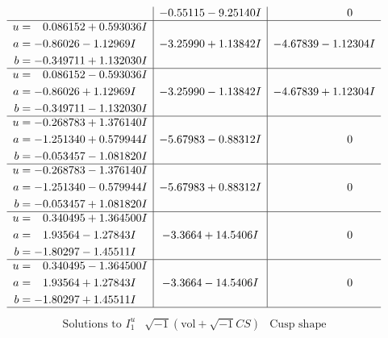 \documentclass[1p]{elsarticle_modified}
\theoremstyle{definition}
\newcommand{\I}{\sqrt{-1}}
\begin{document}
$$\begin{array}{c|c|c}
 & -0.55115 - 9.25140 I & \phantom{-0.000000 } 0 \\ \hline\begin{aligned}
u &= \phantom{-}0.086152 + 0.593036 I \\
a &= -0.86026 - 1.12969 I \\
b &= -0.349711 + 1.132030 I\end{aligned}
 & -3.25990 + 1.13842 I & -4.67839 - 1.12304 I \\ \hline\begin{aligned}
u &= \phantom{-}0.086152 - 0.593036 I \\
a &= -0.86026 + 1.12969 I \\
b &= -0.349711 - 1.132030 I\end{aligned}
 & -3.25990 - 1.13842 I & -4.67839 + 1.12304 I \\ \hline\begin{aligned}
u &= -0.268783 + 1.376140 I \\
a &= -1.251340 + 0.579944 I \\
b &= -0.053457 - 1.081820 I\end{aligned}
 & -5.67983 - 0.88312 I & \phantom{-0.000000 } 0 \\ \hline\begin{aligned}
u &= -0.268783 - 1.376140 I \\
a &= -1.251340 - 0.579944 I \\
b &= -0.053457 + 1.081820 I\end{aligned}
 & -5.67983 + 0.88312 I & \phantom{-0.000000 } 0 \\ \hline\begin{aligned}
u &= \phantom{-}0.340495 + 1.364500 I \\
a &= \phantom{-}1.93564 - 1.27843 I \\
b &= -1.80297 - 1.45511 I\end{aligned}
 & -3.3664 + 14.5406 I & \phantom{-0.000000 } 0 \\ \hline\begin{aligned}
u &= \phantom{-}0.340495 - 1.364500 I \\
a &= \phantom{-}1.93564 + 1.27843 I \\
b &= -1.80297 + 1.45511 I\end{aligned}
 & -3.3664 - 14.5406 I & \phantom{-0.000000 } 0\\
 \hline 
 \end{array}$$\newpage$$\begin{array}{c|c|c}  
\text{Solutions to }I^u_{1}& \I (\text{vol} + \sqrt{-1}CS) & \text{Cusp shape}\\

\end{array}$$
\end{document}
